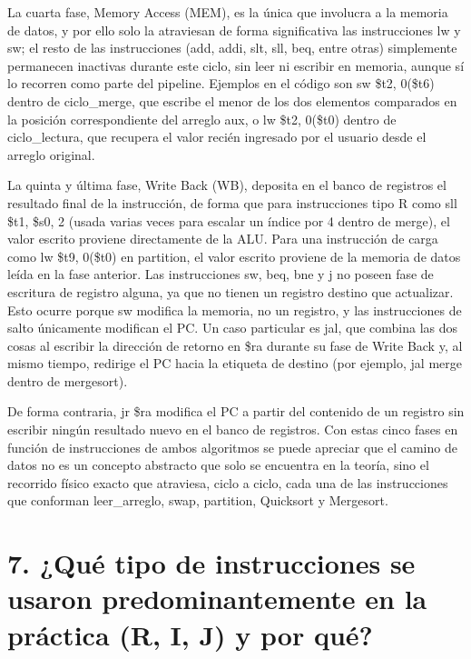 \documentclass[12pt, letterpaper]{article}
\begin{document}
La cuarta fase, Memory Access (MEM), es la única que involucra a la memoria de datos, y por ello solo la atraviesan de forma significativa las instrucciones lw y sw; el resto de las instrucciones (add, addi, slt, sll, beq, entre otras) simplemente permanecen inactivas durante este ciclo, sin leer ni escribir en memoria, aunque sí lo recorren como parte del pipeline. Ejemplos en el código son sw \$t2, 0(\$t6) dentro de ciclo\_merge, que escribe el menor de los dos elementos comparados en la posición correspondiente del arreglo aux, o lw \$t2, 0(\$t0) dentro de ciclo\_lectura, que recupera el valor recién ingresado por el usuario desde el arreglo original.

La quinta y última fase, Write Back (WB), deposita en el banco de registros el resultado final de la instrucción, de forma que para instrucciones tipo R como sll \$t1, \$s0, 2 (usada varias veces para escalar un índice por 4 dentro de merge), el valor escrito proviene directamente de la ALU. Para una instrucción de carga como lw \$t9, 0(\$t0) en partition, el valor escrito proviene de la memoria de datos leída en la fase anterior. Las instrucciones sw, beq, bne y j no poseen fase de escritura de registro alguna, ya que no tienen un registro destino que actualizar. Esto ocurre porque sw modifica la memoria, no un registro, y las instrucciones de salto únicamente modifican el PC. Un caso particular es jal, que combina las dos cosas al escribir la dirección de retorno en \$ra durante su fase de Write Back y, al mismo tiempo, redirige el PC hacia la etiqueta de destino (por ejemplo, jal merge dentro de mergesort).

De forma contraria, jr \$ra modifica el PC a partir del contenido de un registro sin escribir ningún resultado nuevo en el banco de registros. Con estas cinco fases en función de instrucciones de ambos algoritmos se puede apreciar que el camino de datos no es un concepto abstracto que solo se encuentra en la teoría, sino el recorrido físico exacto que atraviesa, ciclo a ciclo, cada una de las instrucciones que conforman leer\_arreglo, swap, partition, Quicksort y Mergesort.

\section*{7. ¿Qué tipo de instrucciones se usaron predominantemente en la práctica (R, I, J) y por qué?}
\end{document}
